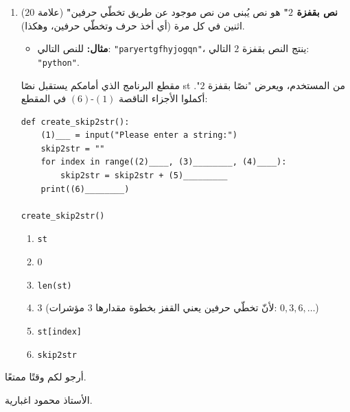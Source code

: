 \documentclass[14pt]{extarticle}
\begin{document}
\begin{enumerate}[resume, label=\textbf{السؤال \arabic*:}, wide=0pt, itemsep=2.2em]
\item ($20$ علامة) \textbf{"نص بقفزة $2$"} هو نص يُبنى من نص موجود عن طريق تخطّي حرفين اثنين في كل مرة (أي أخذ حرف وتخطّي حرفين، وهكذا).
\begin{itemize}
\item \textbf{مثال:} للنص التالي: \textenglish{\texttt{"paryertgfhyjogqn"}}، ينتج النص بقفزة $2$ التالي: \textenglish{\texttt{"python"}}.
\end{itemize}
مقطع البرنامج الذي أمامكم يستقبل نصًا \textenglish{st} من المستخدم، ويعرض "نصًا بقفزة $2$". أكملوا الأجزاء الناقصة $(1)$-$(6)$ في المقطع:

\begin{boxCode}
\begin{english}
\begin{verbatim}
def create_skip2str():
    (1)___ = input("Please enter a string:")
    skip2str = ""
    for index in range((2)____, (3)________, (4)____):
        skip2str = skip2str + (5)_________
    print((6)________)

create_skip2str()
\end{verbatim}
\end{english}
\end{boxCode}

\ifwithsols
\begin{boxSolution}
\begin{enumerate}[label=(\arabic*)]
\item \textenglish{\texttt{st}}
\item $0$
\item \textenglish{\texttt{len(st)}}
\item $3$ (لأنّ تخطّي حرفين يعني القفز بخطوة مقدارها $3$ مؤشرات: $0, 3, 6, \dots$)
\item \textenglish{\texttt{st[index]}}
\item \textenglish{\texttt{skip2str}}
\end{enumerate}
\end{boxSolution}
\fi
\filbreak

\end{enumerate}

\vspace{1cm}
\begin{flushleft}
أرجو لكم وقتًا ممتعًا.

الأستاذ محمود اغبارية.
\end{flushleft}
\end{document}
